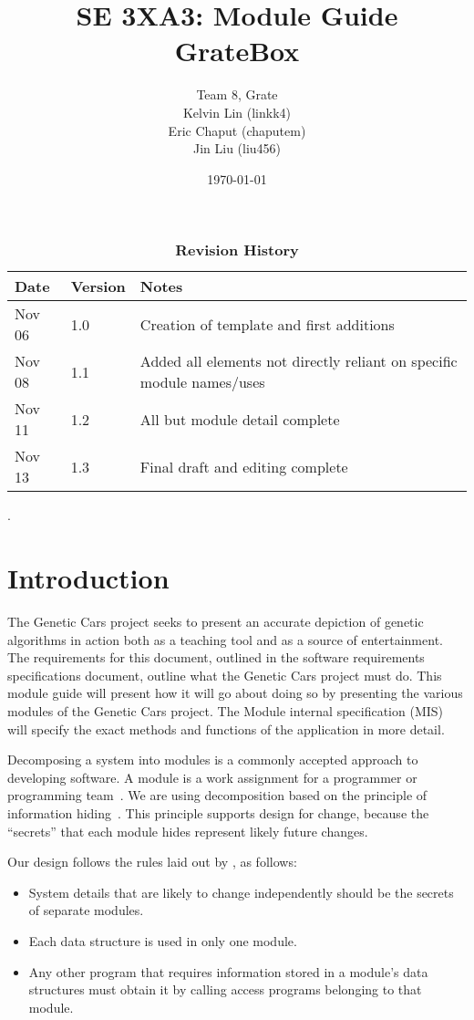 \documentclass[12pt, titlepage]{article}
\title{SE 3XA3: Module Guide\\GrateBox}
\author{Team 8, Grate
		\\ Kelvin Lin (linkk4)
		\\ Eric Chaput (chaputem)
		\\ Jin Liu (liu456)
}
\date{\today}
\begin{document}
\maketitle

\tableofcontents
\listoftables
\begin{table}[h]
\caption{\bf Revision History}
\begin{tabularx}{\textwidth}{p{3cm}p{2cm}X}
\toprule {\bf Date} & {\bf Version} & {\bf Notes}\\
\midrule
Nov 06 & 1.0 & Creation of template and first additions\\
Nov 08 & 1.1 & Added all elements not directly reliant on specific module 
names/uses\\
Nov 11 & 1.2 & All but module detail complete\\
Nov 13 & 1.3 & Final draft and editing complete\\
\bottomrule
\end{tabularx}
\end{table}
\newpage
.
\newpage

\section{Introduction}

The Genetic Cars project seeks to present an accurate depiction of genetic 
algorithms in action both as a teaching tool and as a source of entertainment. 
The requirements for this document, outlined in the software requirements 
specifications document, outline what the Genetic Cars project must do. This 
module guide will present how it will go about doing so by presenting the 
various modules of the Genetic Cars project. The Module internal specification 
(MIS) will specify the exact methods and functions of the application in more 
detail.

Decomposing a system into modules is a commonly accepted approach to developing
software.  A module is a work assignment for a programmer or programming
team~\citep{ParnasEtAl1984}.  We are using decomposition
based on the principle of information hiding~\citep{Parnas1972a}.  This
principle supports design for change, because the ``secrets'' that each module
hides represent likely future changes.  

Our design follows the rules laid out by \citet{ParnasEtAl1984}, as follows:
\begin{itemize}
\item System details that are likely to change independently should be the
  secrets of separate modules.
\item Each data structure is used in only one module.
\item Any other program that requires information stored in a module's data
  structures must obtain it by calling access programs belonging to that module.
\end{itemize}
\end{document}
